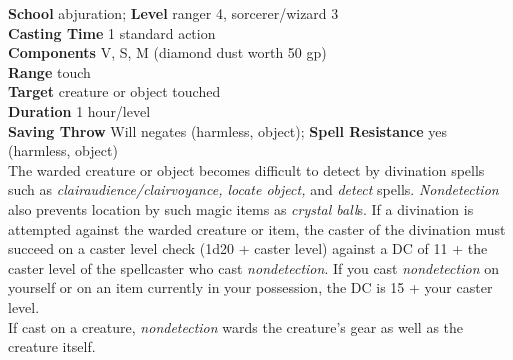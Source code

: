 \textbf{School} abjuration; \textbf{Level} ranger 4, sorcerer/wizard 3\\
\textbf{Casting Time} 1 standard action\\
\textbf{Components} V, S, M (diamond dust worth 50 gp)\\
\textbf{Range} touch\\
\textbf{Target} creature or object touched\\
\textbf{Duration} 1 hour/level\\
\textbf{Saving Throw }Will negates (harmless, object); \textbf{Spell Resistance} yes (harmless, object)\\
The warded creature or object becomes difficult to detect by divination spells such as \textit{clairaudience/clairvoyance, locate object, }and \textit{detect }spells. \textit{Nondetection }also prevents location by such magic items as \textit{crystal ball}s. If a divination is attempted against the warded creature or item, the caster of the divination must succeed on a caster level check (1d20 + caster level) against a DC of 11 + the caster level of the spellcaster who cast \textit{nondetection}. If you cast \textit{nondetection }on yourself or on an item currently in your possession, the DC is 15 + your caster level.\\
If cast on a creature, \textit{nondetection }wards the creature's gear as well as the creature itself.\\
